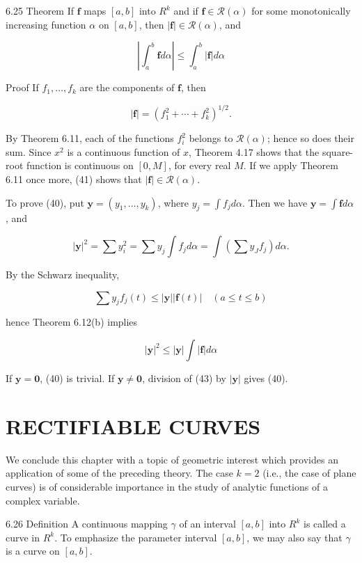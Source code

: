 \documentclass[10pt]{article}
\begin{document}
6.25 Theorem If $\mathbf{f}$ maps $[a, b]$ into $R^{k}$ and if $\mathbf{f} \in \mathscr{R}(\alpha)$ for some monotonically increasing function $\alpha$ on $[a, b]$, then $|\mathbf{f}| \in \mathscr{R}(\alpha)$, and

$$
\left|\int_{a}^{b} \mathbf{f} d \alpha\right| \leq \int_{a}^{b}|\mathbf{f}| d \alpha
$$

Proof If $f_{1}, \ldots, f_{k}$ are the components of $\mathbf{f}$, then

$$
|\mathbf{f}|=\left(f_{1}^{2}+\cdots+f_{k}^{2}\right)^{1 / 2} .
$$

By Theorem 6.11, each of the functions $f_{i}^{2}$ belongs to $\mathscr{R}(\alpha)$; hence so does their sum. Since $x^{2}$ is a continuous function of $x$, Theorem 4.17 shows that the square-root function is continuous on $[0, M]$, for every real $M$. If we apply Theorem 6.11 once more, (41) shows that $|\mathbf{f}| \in \mathscr{R}(\alpha)$.

To prove (40), put $\mathbf{y}=\left(y_{1}, \ldots, y_{k}\right)$, where $y_{j}=\int f_{j} d \alpha$. Then we have $\mathbf{y}=\int \mathbf{f} d \alpha$, and

$$
|\mathbf{y}|^{2}=\sum y_{i}^{2}=\sum y_{j} \int f_{j} d \alpha=\int\left(\sum y_{J} f_{j}\right) d \alpha .
$$

By the Schwarz inequality,

$$
\sum y_{j} f_{j}(t) \leq|\mathbf{y}||\mathbf{f}(t)| \quad(a \leq t \leq b)
$$

hence Theorem 6.12(b) implies

$$
|\mathbf{y}|^{2} \leq|\mathbf{y}| \int|\mathbf{f}| d \alpha
$$

If $\mathbf{y}=\mathbf{0}$, (40) is trivial. If $\mathbf{y} \neq \mathbf{0}$, division of (43) by $|\mathbf{y}|$ gives (40).

\section{RECTIFIABLE CURVES}
We conclude this chapter with a topic of geometric interest which provides an application of some of the preceding theory. The case $k=2$ (i.e., the case of plane curves) is of considerable importance in the study of analytic functions of a complex variable.

6.26 Definition A continuous mapping $\gamma$ of an interval $[a, b]$ into $R^{k}$ is called a curve in $R^{k}$. To emphasize the parameter interval $[a, b]$, we may also say that $\gamma$ is a curve on $[a, b]$.
\end{document}
